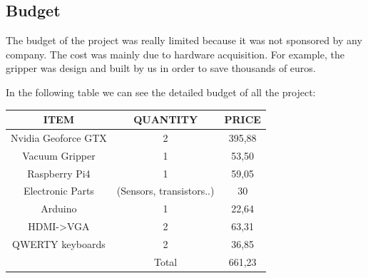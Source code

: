 		\subsection{Budget}
			The budget of the project was really limited because it was not sponsored by any company. The cost was mainly due to hardware acquisition. For example, the gripper was design and built by us in order to save thousands of euros.
			
			In the following table we can see the detailed budget of all the project:
			
			\begin{center}
				\begin{tabular}{ccc}
					\toprule 
					ITEM & QUANTITY & PRICE  \\ 
					\midrule
					Nvidia Geoforce GTX & 2 & 395,88 \\
					\rowcolor{black!20}Vacuum Gripper & 1 & 53,50 \\
					Raspberry Pi4 & 1 & 59,05 \\
					\rowcolor{black!20}Electronic Parts & (Sensors, transistors..) & 30 \\
					Arduino  & 1 & 22,64 \\
					\rowcolor{black!20}HDMI->VGA & 2 & 63,31 \\
					QWERTY keyboards & 2 & 36,85 \\
					\bottomrule
					& Total & 661,23 \\
				\end{tabular}
				\label{tab:budget}
			\end{center}
			